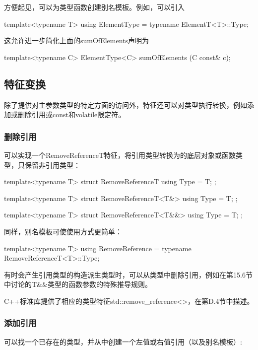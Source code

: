 方便起见，可以为类型函数创建别名模板。例如，可以引入

\begin{cpp}
template<typename T>
using ElementType = typename ElementT<T>::Type;
\end{cpp}

这允许进一步简化上面的sumOfElements声明为

\begin{cpp}
template<typename C>
ElementType<C> sumOfElements (C const& c);
\end{cpp}

\subsection{特征变换}

除了提供对主参数类型的特定方面的访问外，特征还可以对类型执行转换，例如添加或删除引用或const和volatile限定符。

\subsubsection{删除引用}

可以实现一个RemoveReferenceT特征，将引用类型转换为的底层对象或函数类型，只保留非引用类型：

\begin{cpp}
template<typename T>
struct RemoveReferenceT {
	using Type = T;
};

template<typename T>
struct RemoveReferenceT<T&> {
	using Type = T;
};

template<typename T>
struct RemoveReferenceT<T&&> {
	using Type = T;
};
\end{cpp}

同样，别名模板可使使用方式更简单：

\begin{cpp}
template<typename T>
using RemoveReference = typename RemoveReferenceT<T>::Type;
\end{cpp}

有时会产生引用类型的构造派生类型时，可以从类型中删除引用，例如在第15.6节中讨论的T\&\&类型的函数参数的特殊推导规则。

C++标准库提供了相应的类型特征std::remove\_reference<>，在第D.4节中描述。

\subsubsection{添加引用}

可以找一个已存在的类型，并从中创建一个左值或右值引用（以及别名模板）:

